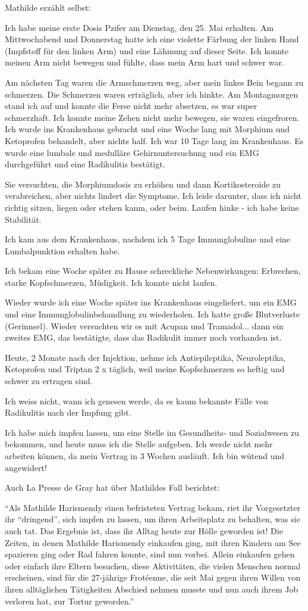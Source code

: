 Mathilde erzählt selbst:

Ich habe meine erste Dosis Pzifer am Dienstag, den 25. Mai erhalten. Am
Mittwochabend und Donnerstag hatte ich eine violette Färbung der linken Hand
(Impfstoff für den linken Arm) und eine Lähmung auf dieser Seite. Ich konnte
meinen Arm nicht bewegen und fühlte, dass mein Arm hart und schwer war.

Am nächsten Tag waren die Armschmerzen weg, aber mein linkes Bein begann zu
schmerzen. Die Schmerzen waren erträglich, aber ich hinkte. Am Montagmorgen
stand ich auf und konnte die Ferse nicht mehr absetzen, es war super
schmerzhaft. Ich konnte meine Zehen nicht mehr bewegen, sie waren
eingefroren. Ich wurde ins Krankenhaus gebracht und eine Woche lang mit Morphium
und Ketoprofen behandelt, aber nichts half. Ich war 10 Tage lang im
Krankenhaus. Es wurde eine lumbale und medulläre Gehirnuntersuchung und ein EMG
durchgeführt und eine Radikulitis bestätigt.

Sie versuchten, die Morphiumdosis zu erhöhen und dann Kortikosteroide zu
verabreichen, aber nichts lindert die Symptome. Ich leide darunter, dass ich
nicht richtig sitzen, liegen oder stehen kanm, oder beim. Laufen hinke - ich
habe keine Stabilität.

Ich kam aus dem Krankenhaus, nachdem ich 5 Tage Immunglobuline und eine
Lumbalpunktion erhalten habe.

Ich bekam eine Woche später zu Hause schreckliche Nebenwirkungen: Erbrechen,
starke Kopfschmerzen, Müdigkeit. Ich konnte nicht laufen.

Wieder wurde ich eine Woche später ins Krankenhaus eingeliefert, um ein EMG und
eine Immunglobulinbehandlung zu wiederholen. Ich hatte große Blutverluste
(Gerinnsel). Wieder versuchten wir es mit Acupan und Tramadol... dann ein
zweites EMG, das bestätigte, dass das Radikulit immer noch vorhanden ist.

Heute, 2 Monate nach der Injektion, nehme ich Antiepileptika, Neuroleptika,
Ketoprofen und Triptan 2 x täglich, weil meine Kopfschmerzen so heftig und
schwer zu ertragen sind.

Ich weiss nicht, wann ich genesen werde, da es kaum bekannte Fälle von
Radikulitis nach der Impfung gibt.

Ich habe mich impfen lassen, um eine Stelle im Gesundheits- und Sozialwesen zu
bekommen, und heute muss ich die Stelle aufgeben. Ich werde nicht mehr arbeiten
können, da mein Vertrag in 3 Wochen ausläuft. Ich bin wütend und angewidert!

Auch La Presse de Gray hat über Mathildes Fall berichtet:

``Als Mathilde Harismendy einen befristeten Vertrag bekam, riet ihr Vorgesetzter
ihr ``dringend'', sich impfen zu lassen, um ihren Arbeitsplatz zu behalten, was
sie auch tat. Das Ergebnis ist, dass ihr Alltag heute zur Hölle geworden ist!
Die Zeiten, in denen Mathilde Harismendy einkaufen ging, mit ihren Kindern am
See spazieren ging oder Rad fahren konnte, sind nun vorbei. Allein einkaufen
gehen oder einfach ihre Eltern besuchen, diese Aktivitäten, die vielen Menschen
normal erscheinen, sind für die 27-jährige Frotéenne, die seit Mai gegen ihren
Willen von ihren alltäglichen Tätigkeiten Abschied nehmen musste und nun auch
ihrem Job verloren hat, zur Tortur geworden.''
